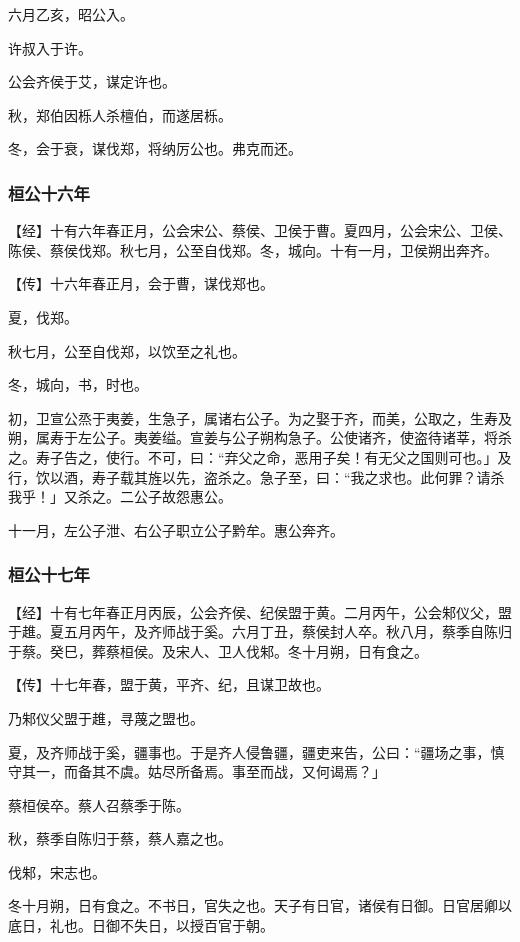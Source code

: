 \documentclass[]{article}
\begin{document}
六月乙亥，昭公入。

许叔入于许。

公会齐侯于艾，谋定许也。

秋，郑伯因栎人杀檀伯，而遂居栎。

冬，会于衰，谋伐郑，将纳厉公也。弗克而还。

\hypertarget{header-n317}{%
\subsubsection{桓公十六年}\label{header-n317}}

【经】十有六年春正月，公会宋公、蔡侯、卫侯于曹。夏四月，公会宋公、卫侯、陈侯、蔡侯伐郑。秋七月，公至自伐郑。冬，城向。十有一月，卫侯朔出奔齐。

【传】十六年春正月，会于曹，谋伐郑也。

夏，伐郑。

秋七月，公至自伐郑，以饮至之礼也。

冬，城向，书，时也。

初，卫宣公烝于夷姜，生急子，属诸右公子。为之娶于齐，而美，公取之，生寿及朔，属寿于左公子。夷姜缢。宣姜与公子朔构急子。公使诸齐，使盗待诸莘，将杀之。寿子告之，使行。不可，曰：``弃父之命，恶用子矣！有无父之国则可也。」及行，饮以酒，寿子载其旌以先，盗杀之。急子至，曰：``我之求也。此何罪？请杀我乎！」又杀之。二公子故怨惠公。

十一月，左公子泄、右公子职立公子黔牟。惠公奔齐。

\hypertarget{header-n327}{%
\subsubsection{桓公十七年}\label{header-n327}}

【经】十有七年春正月丙辰，公会齐侯、纪侯盟于黄。二月丙午，公会邾仪父，盟于趡。夏五月丙午，及齐师战于奚。六月丁丑，蔡侯封人卒。秋八月，蔡季自陈归于蔡。癸巳，葬蔡桓侯。及宋人、卫人伐邾。冬十月朔，日有食之。

【传】十七年春，盟于黄，平齐、纪，且谋卫故也。

乃邾仪父盟于趡，寻蔑之盟也。

夏，及齐师战于奚，疆事也。于是齐人侵鲁疆，疆吏来告，公曰：``疆场之事，慎守其一，而备其不虞。姑尽所备焉。事至而战，又何谒焉？」

蔡桓侯卒。蔡人召蔡季于陈。

秋，蔡季自陈归于蔡，蔡人嘉之也。

伐邾，宋志也。

冬十月朔，日有食之。不书日，官失之也。天子有日官，诸侯有日御。日官居卿以底日，礼也。日御不失日，以授百官于朝。
\end{document}
